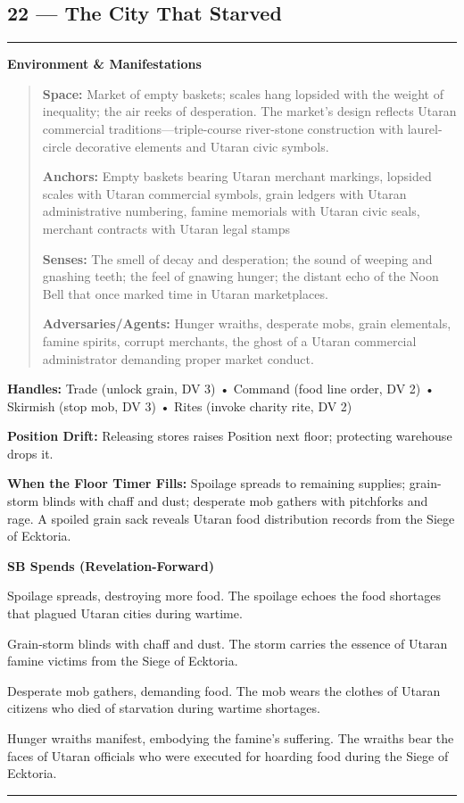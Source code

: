 \documentclass[18pt, letterpaper, twoside]{article}
\newenvironment{floorbox}[1]{%
    \begin{center}
    \begin{minipage}{0.95\textwidth}
    \subsection*{#1}
    \vspace{-0.5em}
    \rule{\textwidth}{0.5pt}
    \vspace{0.5em}
}{%
    \vspace{0.5em}
    \rule{\textwidth}{0.5pt}
    \end{minipage}
    \end{center}
}
\newenvironment{gmnote}[1]{%
    \vspace{0.5em}
    \noindent\textbf{#1}
    \begin{quote}
}{%
    \end{quote}
    \vspace{0.5em}
}
\newcommand{\handles}[1]{\noindent\textbf{Handles:} #1\par}
\newcommand{\sbitem}[2]{\item[#1 SB:] #2}
\begin{document}
\begin{floorbox}{22 --- The City That Starved}
\begin{gmnote}{Environment \& Manifestations}
\textbf{Space:} Market of empty baskets; scales hang lopsided with the weight of inequality; the air reeks of desperation. The market's design reflects Utaran commercial traditions---triple-course river-stone construction with laurel-circle decorative elements and Utaran civic symbols.

\textbf{Anchors:} Empty baskets bearing Utaran merchant markings, lopsided scales with Utaran commercial symbols, grain ledgers with Utaran administrative numbering, famine memorials with Utaran civic seals, merchant contracts with Utaran legal stamps

\textbf{Senses:} The smell of decay and desperation; the sound of weeping and gnashing teeth; the feel of gnawing hunger; the distant echo of the Noon Bell that once marked time in Utaran marketplaces.

\textbf{Adversaries/Agents:} Hunger wraiths, desperate mobs, grain elementals, famine spirits, corrupt merchants, the ghost of a Utaran commercial administrator demanding proper market conduct.
\end{gmnote}

\handles{Trade (unlock grain, DV 3) • Command (food line order, DV 2) • Skirmish (stop mob, DV 3) • Rites (invoke charity rite, DV 2)}

\textbf{Position Drift:} Releasing stores raises Position next floor; protecting warehouse drops it.

\textbf{When the Floor Timer Fills:} Spoilage spreads to remaining supplies; grain-storm blinds with chaff and dust; desperate mob gathers with pitchforks and rage. A spoiled grain sack reveals Utaran food distribution records from the Siege of Ecktoria.

\textbf{SB Spends (Revelation-Forward)}
\begin{description}[leftmargin=*, style=unboxed]
    \sbitem{1}{Spoilage spreads, destroying more food. The spoilage echoes the food shortages that plagued Utaran cities during wartime.}
    \sbitem{2}{Grain-storm blinds with chaff and dust. The storm carries the essence of Utaran famine victims from the Siege of Ecktoria.}
    \sbitem{3}{Desperate mob gathers, demanding food. The mob wears the clothes of Utaran citizens who died of starvation during wartime shortages.}
    \sbitem{4+}{Hunger wraiths manifest, embodying the famine's suffering. The wraiths bear the faces of Utaran officials who were executed for hoarding food during the Siege of Ecktoria.}
\end{description}


\end{floorbox}
\end{document}

